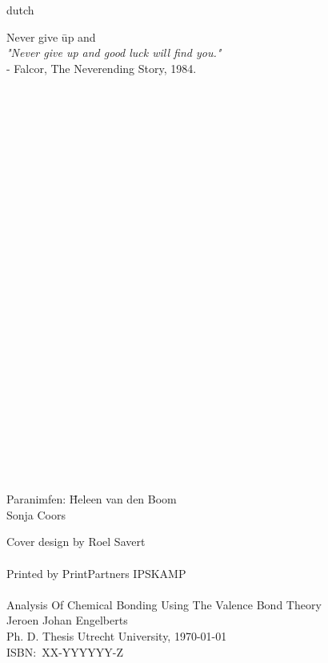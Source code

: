 \begin{otherlanguage*}{dutch}
\newpage
\raggedright
\noindent
\begin{tabbing}
Never give \= up and \kill\\
\textit{"Never give up and good luck will find you."}\\
\> - Falcor, The Neverending Story, 1984.
\end{tabbing}
\mbox{ }\\
\mbox{ }\\
\mbox{ }\\
\mbox{ }\\
\mbox{ }\\
\mbox{ }\\
\mbox{ }\\
\mbox{ }\\
\mbox{ }\\
\mbox{ }\\
\mbox{ }\\
\mbox{ }\\
\mbox{ }\\
\mbox{ }\\
\mbox{ }\\
\mbox{ }\\
\mbox{ }\\
\mbox{ }\\
\mbox{ }\\
\mbox{ }\\
\mbox{ }\\
\mbox{ }\\
\mbox{ }\\
\mbox{ }\\
\mbox{ }\\
\begin{tabbing}
Paranimfen: \=Heleen van den Boom\\
            \>Sonja Coors
\end{tabbing}
\end{otherlanguage*}
Cover design by Roel Savert\\
\mbox{ }\\
Printed by PrintPartners IPSKAMP\\
\mbox{ }\\
Analysis Of Chemical Bonding Using The Valence Bond Theory\\
Jeroen Johan Engelberts\\
Ph. D. Thesis Utrecht University, \today \\
ISBN:~XX-YYYYYY-Z
\newpage

\tableofcontents

\mainmatter \pagestyle{fancy}

